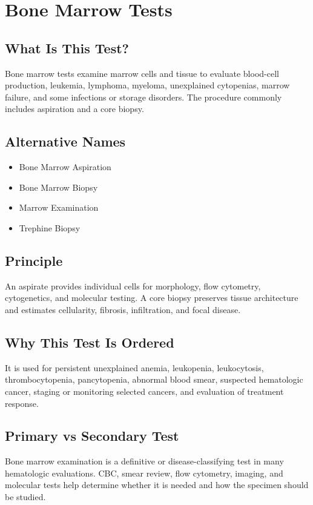 \chapter{Bone Marrow Tests}

\section*{What Is This Test?}
Bone marrow tests examine marrow cells and tissue to evaluate blood-cell production, leukemia, lymphoma, myeloma, unexplained cytopenias, marrow failure, and some infections or storage disorders. The procedure commonly includes aspiration and a core biopsy.

\section*{Alternative Names}
\begin{itemize}
  \item Bone Marrow Aspiration
  \item Bone Marrow Biopsy
  \item Marrow Examination
  \item Trephine Biopsy
\end{itemize}

\section*{Principle}
An aspirate provides individual cells for morphology, flow cytometry, cytogenetics, and molecular testing. A core biopsy preserves tissue architecture and estimates cellularity, fibrosis, infiltration, and focal disease.

\section*{Why This Test Is Ordered}
It is used for persistent unexplained anemia, leukopenia, leukocytosis, thrombocytopenia, pancytopenia, abnormal blood smear, suspected hematologic cancer, staging or monitoring selected cancers, and evaluation of treatment response.

\section*{Primary vs Secondary Test}
Bone marrow examination is a definitive or disease-classifying test in many hematologic evaluations. CBC, smear review, flow cytometry, imaging, and molecular tests help determine whether it is needed and how the specimen should be studied.

